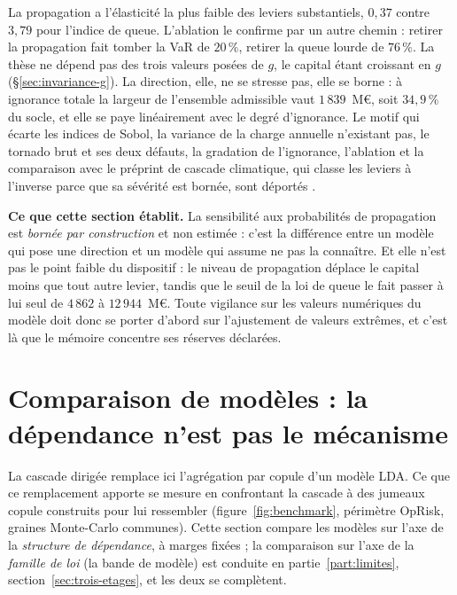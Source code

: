 \vspace{4pt}
\noindent La propagation a l'élasticité la plus faible des leviers substantiels, $0{,}37$ contre
$3{,}79$ pour l'indice de queue. L'ablation le confirme par un autre chemin : retirer la
propagation fait tomber la VaR de $20\,\%$, retirer la queue lourde de $76\,\%$. La thèse ne
dépend pas des trois valeurs posées de $g$, le capital étant croissant en $g$
(\S\ref{sec:invariance-g}). La direction, elle, ne se stresse pas, elle se borne : à ignorance
totale la largeur de l'ensemble admissible vaut $1\,839$~M\euro, soit $34{,}9\,\%$ du socle, et
elle se paye linéairement avec le degré d'ignorance. Le motif qui écarte les indices de Sobol, la
variance de la charge annuelle n'existant pas, le tornado brut et ses deux défauts, la gradation
de l'ignorance, l'ablation et la comparaison avec le préprint de cascade climatique, qui classe
les leviers à l'inverse parce que sa sévérité est bornée, sont déportés
\matcomp.

\begin{cle}
\textbf{Ce que cette section établit.} La sensibilité aux probabilités de propagation est
\emph{bornée par construction} et non estimée : c'est la différence entre un modèle qui pose une
direction et un modèle qui assume ne pas la connaître. Et elle n'est pas le point faible du
dispositif : le niveau de propagation déplace le capital moins que tout autre levier, tandis que
le seuil de la loi de queue le fait passer à lui seul de $4\,862$ à $12\,944$~M\euro. Toute vigilance sur les
valeurs numériques du modèle doit donc se porter d'abord sur l'ajustement de valeurs extrêmes,
et c'est là que le mémoire concentre ses réserves déclarées.
\end{cle}

\section{Comparaison de modèles : la dépendance n'est pas le mécanisme}
\label{sec:benchmark}

La cascade dirigée remplace ici l'agrégation par copule d'un modèle LDA. Ce que ce
remplacement apporte se mesure en confrontant la cascade à des jumeaux copule construits pour lui
ressembler (figure~\ref{fig:benchmark}, périmètre OpRisk, graines
Monte-Carlo communes). Cette section compare les modèles sur l'axe de la \emph{structure de
dépendance}, à marges fixées ; la comparaison sur l'axe de la \emph{famille de loi} (la bande
de modèle) est conduite en partie~\ref{part:limites}, section~\ref{sec:trois-etages}, et les
deux se complètent.

